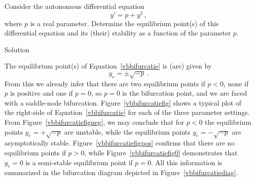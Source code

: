 \newpage

\begin{example}
Consider the autonomous differential equation
\begin{equation}
y'=p+y^2\,,
\label{vbbifurcatie}
\end{equation}
where $p$ is a real parameter. Determine the equilibrium point(s) of this differential equation and its (their) stability as a function of the parameter $p$. 

Solution 

The equilibrium point(s) of Equation~\eqref{vbbifurcatie} is (are) given by
$$
y_e=\pm\sqrt{-p}\,.
$$
From this we already infer that there are two equilibrium points if $p<0$, none if $p$ is positive and one if $p=0$, so $p=0$ is the bifurcation point, and we are faced with a saddle-node bifurcation. Figure~\ref{vbbifurcatiefig} shows a typical plot of the right-side of Equation~\eqref{vbbifurcatie} for each of the three parameter settings. From Figure~\ref{vbbifurcatiefigneg}, we may conclude that for $p<0$ the equilibrium points $y_e=+\sqrt{-p}$ are unstable, while the equilibrium points $y_e=-\sqrt{-p}$ are asymptotically stable. Figure~\ref{vbbifurcatiefigpos} confirms that there are no equilibrium points if $p>0$, while Figure~\ref{vbbifurcatiefig0} demonstrates that $y_e=0$ is a semi-stable equilibrium point if $p=0$. All this information is summarized in the bifurcation diagram depicted in Figure~\ref{vbbifurcatiediag}.

\begin{figure}[H]


\end{figure}
\end{example}

